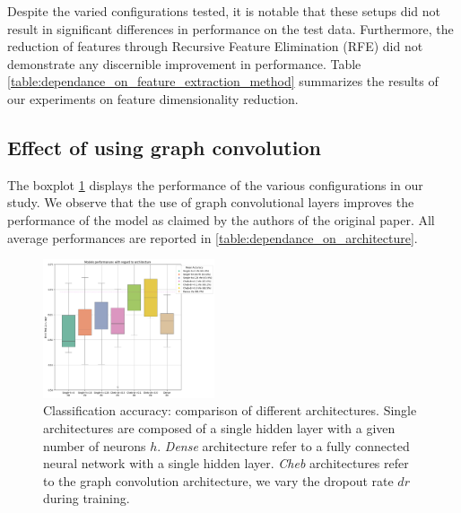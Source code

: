 Despite the varied configurations tested, it is notable that these setups did not result in significant differences in performance on the test data. Furthermore, the reduction of features through Recursive Feature Elimination (RFE) did not demonstrate any discernible improvement in performance.
Table \ref{table:dependance_on_feature_extraction_method} summarizes the results of our experiments on feature dimensionality reduction.

\subsection{Effect of using graph convolution}

The boxplot \ref{fig:results_architecture} displays the performance of the various configurations in our study. We observe that the use of graph convolutional layers improves the performance of the model as claimed by the authors of the original paper. All average performances
are reported in \ref{table:dependance_on_architecture}.

\begin{figure}[h!]
    \centering
    \includegraphics[width=0.45\textwidth]{figures/model_performances_architecture.png}
    \caption{Classification accuracy: comparison of different architectures.
    Single architectures are composed of a single hidden layer with a given number of neurons $h$.
    \textit{Dense} architecture refer to a fully connected neural network with a single hidden layer.
    \textit{Cheb} architectures refer to the graph convolution architecture, we vary the dropout rate $dr$
    during training.}
    \Description{}
    \label{fig:results_architecture}
\end{figure}

